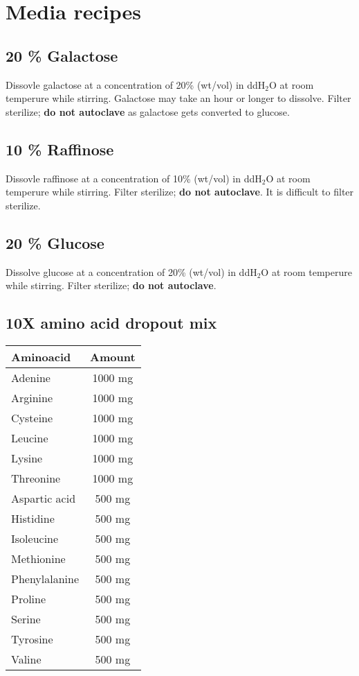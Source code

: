 \section{Media recipes}
	\subsection{20 \% Galactose}
	Dissovle galactose at a concentration of 20\% (wt/vol) in ddH$_{2}$O at room temperure while stirring. Galactose may take an hour or longer to dissolve. Filter sterilize;  {\bf do not autoclave} as galactose gets converted to glucose.
		\subsection{10 \% Raffinose}
	Dissovle raffinose at a concentration of 10\% (wt/vol) in ddH$_{2}$O at room temperure while stirring. Filter sterilize;  {\bf do not autoclave}.	It is difficult to filter sterilize.
	\subsection{20 \% Glucose}
	Dissolve glucose at a concentration of 20\% (wt/vol) in ddH$_{2}$O at room temperure while stirring. Filter sterilize;  {\bf do not autoclave}.
	
		\subsection{10X amino acid dropout mix}
		\begin{tabular}{l c }
			{\bf Aminoacid} & {\bf Amount}\\
			\hline
			Adenine & 1000 mg \\
			Arginine & 1000 mg  \\
			Cysteine & 1000 mg \\
			Leucine & 1000 mg \\
			Lysine& 1000 mg \\
			Threonine & 1000 mg \\
			Aspartic acid & 500 mg \\
			Histidine & 500 mg \\
			Isoleucine & 500 mg \\
			Methionine & 500 mg \\
			Phenylalanine & 500 mg \\
			Proline & 500 mg \\
			Serine & 500 mg \\
			Tyrosine & 500 mg \\
			Valine & 500 mg \\
		\end{tabular}
		
